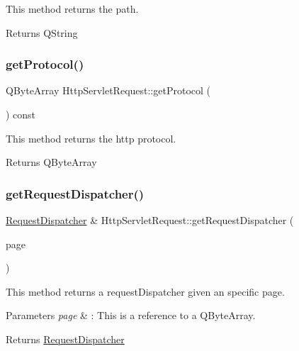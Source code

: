This method returns the path. 

\begin{DoxyReturn}{Returns}
Q\+String 
\end{DoxyReturn}
\mbox{\label{class_http_servlet_request_af41af16fdcb738253fe34eaacff17af1}} 
\subsubsection{\texorpdfstring{get\+Protocol()}{getProtocol()}}
{\footnotesize\ttfamily Q\+Byte\+Array Http\+Servlet\+Request\+::get\+Protocol (\begin{DoxyParamCaption}{ }\end{DoxyParamCaption}) const\hspace{0.3cm}{\ttfamily [inline]}}



This method returns the http protocol. 

\begin{DoxyReturn}{Returns}
Q\+Byte\+Array 
\end{DoxyReturn}
\mbox{\label{class_http_servlet_request_a965af0d27573882ca8a09cc813530a42}} 
\subsubsection{\texorpdfstring{get\+Request\+Dispatcher()}{getRequestDispatcher()}}
{\footnotesize\ttfamily \hyperlink{class_request_dispatcher}{Request\+Dispatcher} \& Http\+Servlet\+Request\+::get\+Request\+Dispatcher (\begin{DoxyParamCaption}\item[{const Q\+String \&}]{page }\end{DoxyParamCaption})}



This method returns a request\+Dispatcher given an specific page. 


\begin{DoxyParams}{Parameters}
{\em page} & \+: This is a reference to a Q\+Byte\+Array. \\
\hline
\end{DoxyParams}
\begin{DoxyReturn}{Returns}
\hyperlink{class_request_dispatcher}{Request\+Dispatcher} 
\end{DoxyReturn}
\mbox{\label{class_http_servlet_request_a788609a8520897ecaa91875a91b0e921}} 

